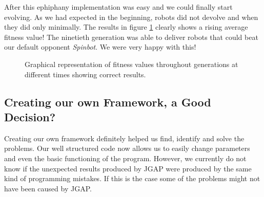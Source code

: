 \documentclass[a4paper,10pt]{article}
\begin{document}
After this ephiphany implementation was easy and we could finally start evolving. As we had expected in the beginning, robots did not devolve and when they did only minimally. The results in figure \ref{fig:result_3} clearly shows a rising average fitness value! The ninetieth generation was able to deliver robots that could beat our default opponent \textit{Spinbot}. We were very happy with this!

\begin{figure}[h!]
  \centering
  \caption{Graphical representation of fitness values throughout generations at different times showing correct results.}
  \label{fig:result_3}
\end{figure}

\subsection{Creating our own Framework, a Good Decision?}
Creating our own framework definitely helped us find, identify and solve the problems. Our well structured code now allows us to easily change parameters and even the basic functioning of the program. However, we currently do not know if the unexpected results produced by JGAP were produced by the same kind of programming mistakes. If this is the case some of the problems might not have been caused by JGAP.\\
\end{document}
